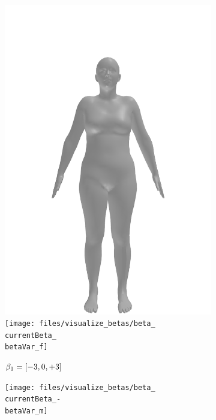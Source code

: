 \begin{figure}[h!]
\begin{subfigure}{\betaWidth}
        \includegraphics[width=\imgWidth]{files/visualize_betas/baseline_f}
        \texttt{[image: files/visualize\_betas/beta\_\\currentBeta\_\\betaVar\_f]}
        \caption{$\beta_1 = [-3, 0, +3]$}
    \end{subfigure}
    \begin{subfigure}{\betaWidth}
        \def\currentBeta{1}
        \centering
        \texttt{[image: files/visualize\_betas/beta\_\\currentBeta\_-\\betaVar\_m]}

\end{subfigure}
\end{figure}
